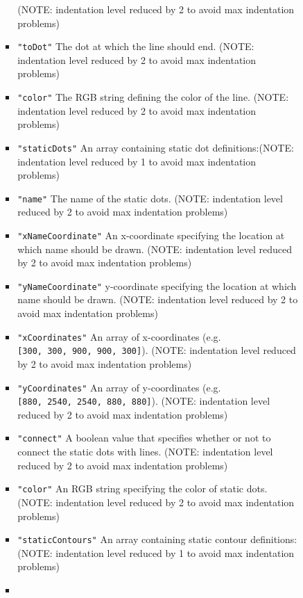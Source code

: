 \documentclass[]{book}
\theoremstyle{definition}
\theoremstyle{definition}
\theoremstyle{definition}
\theoremstyle{remark}
\begin{document}
\begin{itemize}
\begin{itemize}
\begin{itemize}
\begin{itemize}
        (NOTE: indentation level reduced by 2 to avoid max indentation
        problems)
      \item
        \texttt{"toDot"} The dot at which the line should end. (NOTE:
        indentation level reduced by 2 to avoid max indentation
        problems)
      \item
        \texttt{"color"} The RGB string defining the color of the line.
        (NOTE: indentation level reduced by 2 to avoid max indentation
        problems)
      \item
        \texttt{"staticDots"} An array containing static dot
        definitions:(NOTE: indentation level reduced by 1 to avoid max
        indentation problems)
      \item
        \texttt{"name"} The name of the static dots. (NOTE: indentation
        level reduced by 2 to avoid max indentation problems)
      \item
        \texttt{"xNameCoordinate"} An x-coordinate specifying the
        location at which name should be drawn. (NOTE: indentation level
        reduced by 2 to avoid max indentation problems)
      \item
        \texttt{"yNameCoordinate"} y-coordinate specifying the location
        at which name should be drawn. (NOTE: indentation level reduced
        by 2 to avoid max indentation problems)
      \item
        \texttt{"xCoordinates"} An array of x-coordinates (e.g.
        \texttt{{[}300,~300,~900,~900,~300{]}}). (NOTE: indentation
        level reduced by 2 to avoid max indentation problems)
      \item
        \texttt{"yCoordinates"} An array of y-coordinates (e.g.
        \texttt{{[}880,~2540,~2540,~880,~880{]}}). (NOTE: indentation
        level reduced by 2 to avoid max indentation problems)
      \item
        \texttt{"connect"} A boolean value that specifies whether or not
        to connect the static dots with lines. (NOTE: indentation level
        reduced by 2 to avoid max indentation problems)
      \item
        \texttt{"color"} An RGB string specifying the color of static
        dots. (NOTE: indentation level reduced by 2 to avoid max
        indentation problems)
      \item
        \texttt{"staticContours"} An array containing static contour
        definitions: (NOTE: indentation level reduced by 1 to avoid max
        indentation problems)
      \item

\end{itemize}
\end{itemize}
\end{itemize}
\end{itemize}
\end{document}
